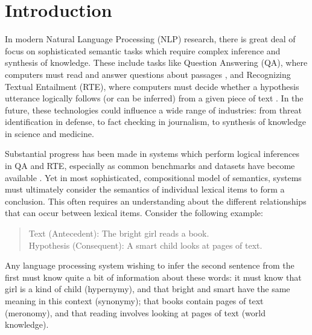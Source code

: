 \chapter{Introduction}
\label{ch:intro}

In modern Natural Language Processing (NLP) research, there is great deal of
focus on sophisticated semantic tasks which require complex inference and
synthesis of knowledge. These include tasks like Question Answering (QA), where
computers must read and answer questions about passages
\cite{hermann:2015:nips,weston:2016:iclr}, and Recognizing Textual Entailment
(RTE), where computers must decide whether a hypothesis utterance logically
follows (or can be inferred) from a given piece of text
\cite{dagan:2006:mlc,marelli:2014:semeval,bowman:2015:emnlp}. In the future,
these technologies could influence a wide range of industries: from threat
identification in defense, to fact checking in journalism, to
synthesis of knowledge in science and medicine.

Substantial progress has been made in systems which perform
logical inferences in QA and RTE, especially as common benchmarks
and datasets have become available
\cite{dagan:2006:mlc,giampiccolo:2007:pascal,bentivogli:2009:tac,marelli:2014:semeval,bowman:2015:emnlp}.
Yet in most sophisticated, compositional model of semantics, systems must
ultimately consider the semantics of individual lexical items to form a
conclusion. This often requires an understanding about the different
relationships that can occur between lexical items. Consider the following
example:
\begin{quote}
  \label{ex:rte}
  Text (Antecedent): The bright girl reads a book.\\
  Hypothesis (Consequent): A smart child looks at pages of text.
\end{quote}
Any language processing system wishing to infer the second sentence from the
first must know quite a bit of information about these words: it must know that
girl is a kind of child (hypernymy), and that bright and smart have the same
meaning in this context (synonymy); that books contain pages of text
(meronomy), and that reading involves looking at pages of text (world knowledge).

